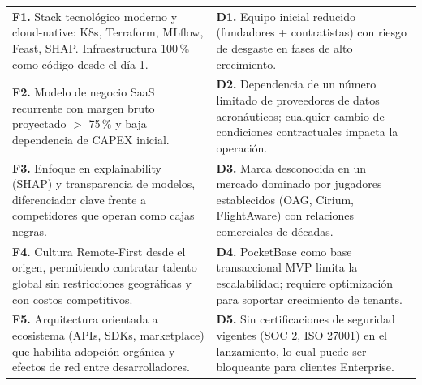 ﻿\documentclass[11pt, letterpaper]{article}
\begin{document}
\begin{table}[H]

\small

\centering

\begin{tabularx}{\linewidth}{>{\raggedright\arraybackslash}p{6.5cm} >{\raggedright\arraybackslash}X}

\toprule

\multicolumn{1}{>{\raggedright\arraybackslash}p{6.5cm}}{\textbf{Fortalezas (Internas)}} &

\multicolumn{1}{>{\raggedright\arraybackslash}X}{\textbf{Debilidades (Internas)}} \\

\midrule

\textbf{F1.} Stack tecnológico moderno y cloud-native: K8s, Terraform, MLflow, Feast, SHAP. Infraestructura 100\,\% como código desde el día 1. & \textbf{D1.} Equipo inicial reducido (fundadores + contratistas) con riesgo de desgaste en fases de alto crecimiento. \\

\textbf{F2.} Modelo de negocio SaaS recurrente con margen bruto proyectado $>$ 75\,\% y baja dependencia de CAPEX inicial. & \textbf{D2.} Dependencia de un número limitado de proveedores de datos aeronáuticos; cualquier cambio de condiciones contractuales impacta la operación. \\

\textbf{F3.} Enfoque en explainability (SHAP) y transparencia de modelos, diferenciador clave frente a competidores que operan como cajas negras. & \textbf{D3.} Marca desconocida en un mercado dominado por jugadores establecidos (OAG, Cirium, FlightAware) con relaciones comerciales de décadas. \\

\textbf{F4.} Cultura Remote-First desde el origen, permitiendo contratar talento global sin restricciones geográficas y con costos competitivos. & \textbf{D4.} PocketBase como base transaccional MVP limita la escalabilidad; requiere optimización para soportar crecimiento de tenants. \\

\textbf{F5.} Arquitectura orientada a ecosistema (APIs, SDKs, marketplace) que habilita adopción orgánica y efectos de red entre desarrolladores. & \textbf{D5.} Sin certificaciones de seguridad vigentes (SOC 2, ISO 27001) en el lanzamiento, lo cual puede ser bloqueante para clientes Enterprise. \\


\end{tabularx}
\end{table}
\end{document}
